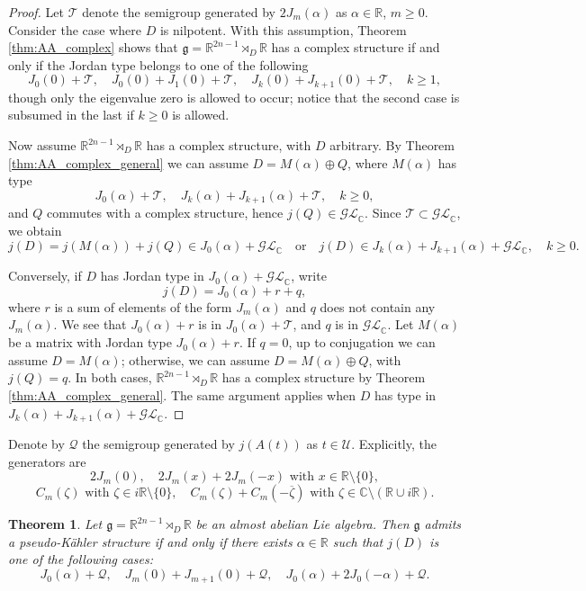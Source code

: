 \documentclass{article}
\newtheorem{theorem}{Theorem}[section]
\theoremstyle{definition}
\newcommand{\R}{\mathbb{R}}
\newcommand{\C}{\mathbb{C}}
\newcommand{\lie}[1]{\mathfrak{#1}}
\newcommand{\g}{\lie g}
\begin{document}
\begin{proof}
    Let $\mathcal{T}$ denote the semigroup generated by $2J_m(\alpha)$ as $\alpha\in\R$, $m\geq0$. Consider the case where $D$ is nilpotent. With this assumption, Theorem \ref{thm:AA_complex} shows that $\g=\R^{2n-1}\rtimes_D\R$ has a complex structure if and only if the Jordan type belongs to one of the following $$J_0(0)+\mathcal{T},\quad J_0(0)+J_1(0)+\mathcal{T},\quad J_k(0)+J_{k+1}(0)+\mathcal{T},\quad k\geq1,$$ though only the eigenvalue zero is allowed to occur; notice that the second case is subsumed in the last if $k\geq0$ is allowed.\medskip

    Now assume $\R^{2n-1}\rtimes_D\R$ has a complex structure, with $D$ arbitrary. By Theorem \ref{thm:AA_complex_general} we can assume $D=M(\alpha)\oplus Q$, where $M(\alpha)$ has type $$J_0(\alpha)+\mathcal{T},\quad  J_k(\alpha)+J_{k+1}(\alpha)+\mathcal{T},\quad k\geq0,$$ and $Q$ commutes with a complex structure, hence $j(Q)\in\mathcal{GL}_\C$. Since $\mathcal{T}\subset\mathcal{GL}_\C$, we obtain $$j(D)=j(M(\alpha))+j(Q)\in J_0(\alpha)+\mathcal{GL}_\C\quad\text{or}\quad j(D)\in J_k(\alpha)+J_{k+1}(\alpha)+\mathcal{GL}_\C,\quad k\geq0.$$

    Conversely, if $D$ has Jordan type in $J_0(\alpha)+\mathcal{GL}_\C$, write $$j(D)=J_0(\alpha)+r+q,$$ where $r$ is a sum of elements of the form $J_m(\alpha)$ and $q$ does not contain any $J_m(\alpha)$. We see that $J_0(\alpha)+r$ is in $J_0(\alpha)+\mathcal{T}$, and $q$ is in $\mathcal{GL}_\C$. Let $M(\alpha)$ be a matrix with Jordan type $J_0(\alpha)+r$. If $q=0$, up to conjugation we can assume $D=M(\alpha)$; otherwise, we can assume $D=M(\alpha)\oplus Q$, with $j(Q)=q$. In both cases, $\R^{2n-1}\rtimes_D\R$ has a complex structure by Theorem \ref{thm:AA_complex_general}. The same argument applies when $D$ has type in $J_k(\alpha)+J_{k+1}(\alpha)+\mathcal{GL}_\C$.
\end{proof}

Denote by $\mathcal{Q}$ the semigroup generated by $j(A(t))$ as $t\in\mathcal{U}$. Explicitly, the generators are $$2J_m(0),\quad   2J_m(x)+2J_m(-x)\text{ with }x\in\R\setminus\{0\},$$ $$C_m(\zeta)\text{ with }\zeta\in i\R\setminus\{0\},\quad C_m(\zeta)+C_m(-\overline\zeta)\text{ with }\zeta\in\C\setminus(\R\cup i\R).$$

\begin{theorem}\label{thm:jordantypes}
    Let $\g=\R^{2n-1}\rtimes_D\R$ be an almost abelian Lie algebra. Then $\g$ admits a pseudo-Kähler structure if and only if there exists $\alpha\in\R$ such that $j(D)$ is one of the following cases: $$J_0(\alpha)+\mathcal{Q}, \quad J_m(0)+J_{m+1}(0)+\mathcal{Q}, \quad J_0(\alpha)+2J_0(-\alpha)+\mathcal{Q}.$$
\end{theorem}
\end{document}
